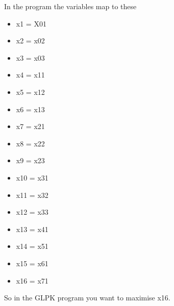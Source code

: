 \documentclass[10pt]{article}
\begin{document}
In the program the variables map to these 
\begin{itemize}
    \item x1 = X01
    \item x2 = x02
    \item x3 = x03
    \item x4 = x11
    \item x5 = x12
    \item x6 = x13
    \item x7 = x21
    \item x8 = x22
    \item x9 = x23
    \item x10 = x31
    \item x11 = x32
    \item x12 = x33
    \item x13 = x41
    \item x14 = x51
    \item x15 = x61
    \item x16 = x71
\end{itemize}{}
So in the GLPK program you want to maximise x16.
\end{document}

